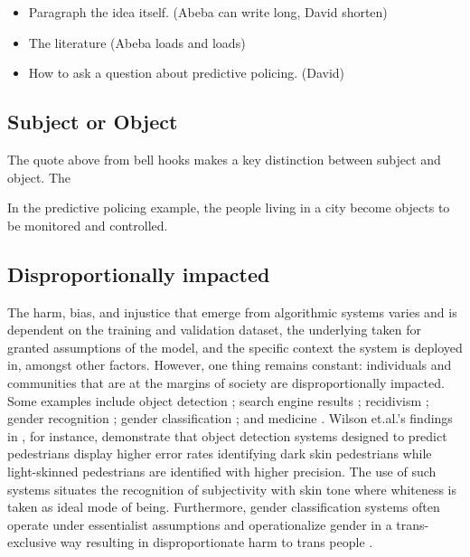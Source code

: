 \begin{itemize}
    \item Paragraph the idea itself.  (Abeba can write long, David shorten)
    \item The literature (Abeba loads and loads)
    \item How to ask a question about predictive policing. (David)
\end{itemize}



\subsection{Subject or Object}
\label{sec:subjectobject}

The quote above from bell hooks makes a key distinction between subject and object. The 


In the predictive policing example, the people living in a city become objects to be monitored and controlled. 



\subsection{Disproportionally impacted}

\label{sec:disproportionally}
The harm, bias, and injustice that emerge from algorithmic systems varies and is dependent on the training and validation dataset, the underlying taken for granted assumptions of the model, and the specific context the system is deployed in, amongst other factors. However, one thing remains constant: individuals and communities that are at the margins of society are disproportionally impacted. Some examples include object detection \cite{wilson2019predictive}; search engine results \cite{noble2018algorithms}; recidivism \cite{angwin2016machine}; gender recognition \cite{buolamwini2018gender}; gender classification \cite{hamidi2018gender,barlassee2020}; and medicine \cite{obermeyer2019dissecting}. Wilson et.al.'s findings in \cite{wilson2019predictive}, for instance, demonstrate that object detection systems designed to predict pedestrians display higher error rates identifying dark skin pedestrians while light-skinned pedestrians are identified with higher precision. The use of such systems situates the recognition of subjectivity with skin tone where whiteness is taken as ideal mode of being. Furthermore, gender classification systems often operate under essentialist assumptions and operationalize gender in a trans-exclusive way resulting in disproportionate harm to trans people \cite{keyes2018misgendering,hamidi2018gender}.  


